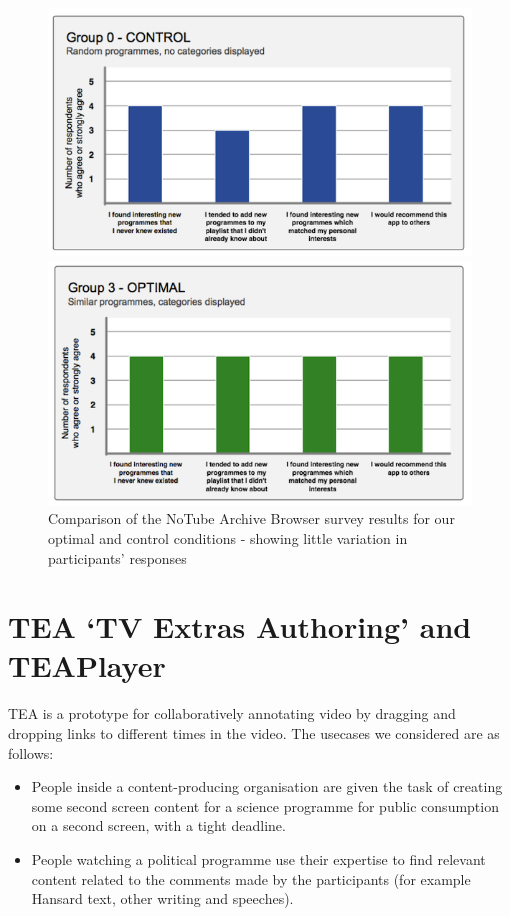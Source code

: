 \documentclass{notube}
\begin{document}
\begin{figure}[htbp]
\begin{center}
\includegraphics[width=5in]{images/group0.png}

\includegraphics[width=5in]{images/group3.png}
\caption{Comparison of the NoTube Archive Browser survey results for our optimal and control conditions - showing little variation in participants' responses} \label{fig:group3}
\end{center}
\end{figure}


\chapter{TEA `TV Extras Authoring' and TEAPlayer}

TEA is a prototype for collaboratively annotating video by dragging and dropping links to different times in the video. The usecases we considered are as follows: 

\begin{itemize}
\item{People inside a content-producing organisation are given the task of creating some second screen content for a science programme for public consumption on a second screen, with a tight deadline.}
\item{People watching a political programme use their expertise to find relevant content related to the comments made by the participants (for example Hansard text, other writing and speeches).}
\end{itemize}
\end{document}
